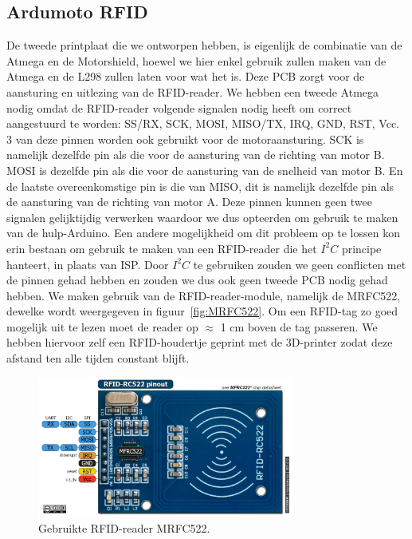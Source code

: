 \subsection{Ardumoto RFID}
De tweede printplaat die we ontworpen hebben, is eigenlijk de combinatie van de Atmega en de Motorshield, hoewel we hier enkel gebruik zullen maken van de Atmega en de L298 zullen laten voor wat het is. Deze PCB zorgt voor de aansturing en uitlezing van de RFID-reader. We hebben een tweede Atmega nodig omdat de RFID-reader volgende signalen nodig heeft om correct aangestuurd te worden: SS/RX, SCK, MOSI, MISO/TX, IRQ, GND, RST, Vcc. 3 van deze pinnen worden ook gebruikt voor de motoraansturing. SCK is namelijk dezelfde pin als die voor de aansturing van de richting van motor B. MOSI is dezelfde pin als die voor de aansturing van de snelheid van motor B. En de laatste overeenkomstige pin is die van MISO, dit is namelijk dezelfde pin als de aansturing van de richting van motor A. Deze pinnen kunnen geen twee signalen gelijktijdig verwerken waardoor we dus opteerden om gebruik te maken van de hulp-Arduino. Een andere mogelijkheid om dit probleem op te lossen kon erin bestaan om gebruik te maken van een RFID-reader die het $I^{2}C$ principe hanteert, in plaats van ISP. Door $I^{2}C$ te gebruiken zouden we geen conflicten met de pinnen gehad hebben en zouden we dus ook geen tweede PCB nodig gehad hebben. We maken gebruik van de RFID-reader-module, namelijk de MRFC522, dewelke wordt weergegeven in figuur~\ref{fig:MRFC522}. Om een RFID-tag zo goed mogelijk uit te lezen moet de reader op $\approx$ 1 cm boven de tag passeren. We hebben hiervoor zelf een RFID-houdertje geprint met de 3D-printer zodat deze afstand ten alle tijden constant blijft.
\begin{figure}[h]
\centering
\includegraphics[width=0.75\textwidth]{MRFC522.png}
\caption{Gebruikte RFID-reader MRFC522. \label{fig:MRFC522}}
\label{fig:ACEquiv}
\end{figure}
